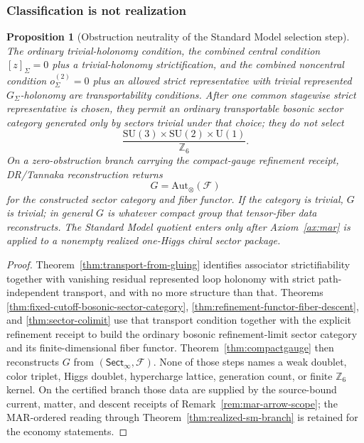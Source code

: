 \documentclass[11pt]{article}
\newtheorem{proposition}[theorem]{Proposition}
\newcommand{\SU}{\mathrm{SU}}
\newcommand{\U}{\mathrm{U}}
\begin{document}
\subsubsection{Classification is not realization}

\begin{proposition}[Obstruction neutrality of the Standard Model selection step]\label{prop:obstruction-neutrality}
The ordinary trivial-holonomy condition, the combined central condition
\([z]_\Sigma=0\) plus a trivial-holonomy strictification, and the combined noncentral condition
\(o^{(2)}_\Sigma=0\) plus an allowed strict representative with trivial represented
\(G_\Sigma\)-holonomy are transportability
conditions. After one common stagewise strict representative is chosen, they permit an
ordinary transportable bosonic sector category generated only by sectors trivial under that
choice; they do not select
\[
\frac{\SU(3)\times\SU(2)\times\U(1)}{\mathbb Z_6}.
\]
On a zero-obstruction branch carrying the compact-gauge refinement receipt, DR/Tannaka
reconstruction returns
\[
G=\mathrm{Aut}_\otimes(\mathcal F)
\]
for the constructed sector category and fiber functor. If the category is trivial, \(G\) is
trivial; in general \(G\) is whatever compact group that tensor-fiber data reconstructs. The
Standard Model quotient enters only after Axiom~\ref{ax:mar} is applied to a nonempty realized
one-Higgs chiral sector package.
\end{proposition}

\begin{proof}
Theorem~\ref{thm:transport-from-gluing} identifies associator strictifiability together with
vanishing residual represented loop holonomy with strict path-independent transport, and with no
more structure than that. Theorems
\ref{thm:fixed-cutoff-bosonic-sector-category}, \ref{thm:refinement-functor-fiber-descent}, and
\ref{thm:sector-colimit} use that transport condition together with the explicit refinement
receipt to build the ordinary bosonic refinement-limit sector category and its finite-dimensional
fiber functor. Theorem~\ref{thm:compactgauge} then
reconstructs \(G\) from \((\mathsf{Sect}_\infty,\mathcal F)\). None of those steps names a weak
doublet, color triplet, Higgs doublet, hypercharge lattice, generation count, or finite
\(\mathbb Z_6\) kernel. On the certified branch those data are supplied by the source-bound
current, matter, and descent receipts of Remark~\ref{rem:mar-arrow-scope}; the
MAR-ordered reading through Theorem~\ref{thm:realized-sm-branch} is retained
for the economy statements.
\end{proof}
\end{document}
